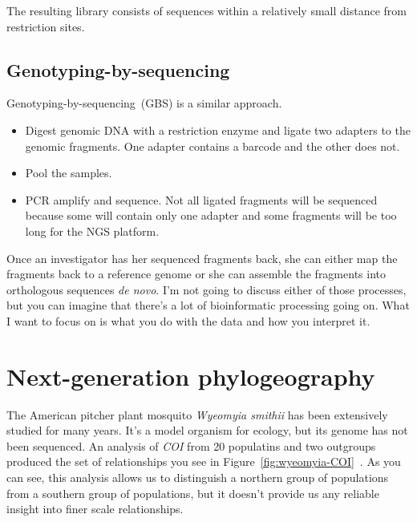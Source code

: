 The resulting library consists of sequences within a relatively small
distance from restriction sites. 

\subsection*{Genotyping-by-sequencing}

Genotyping-by-sequencing~(GBS) is a similar approach. 

\begin{itemize}

\item Digest genomic DNA with a restriction enzyme and ligate two
  adapters to the genomic fragments. One adapter contains a barcode
  and the other does not.

\item Pool the samples.

\item PCR amplify and sequence. Not all ligated fragments will be
  sequenced because some will contain only one adapter and some
  fragments will be too long for the NGS platform.

\end{itemize}

Once an investigator has her sequenced fragments back, she can either
map the fragments back to a reference genome or she can assemble the
fragments into orthologous sequences {\it de novo}. I'm not going to
discuss either of those processes, but you can imagine that there's a
lot of bioinformatic processing going on. What I want to focus on is
what you do with the data and how you interpret it.

\section*{Next-generation phylogeography}

The American pitcher plant mosquito {\it Wyeomyia
  smithii\/} has been extensively studied for many years. It's a model
organism for ecology, but its genome has not been sequenced. An
analysis of {\it COI} from 20 populatins and two outgroups produced
the set of relationships you see in
Figure~\ref{fig:wyeomyia-COI}~\cite{Emerson-etal-2010}.
As you can see, this analysis allows us to distinguish a northern
group of populations from a southern group of populations, but it
doesn't provide us any reliable insight into finer scale
relationships. 

